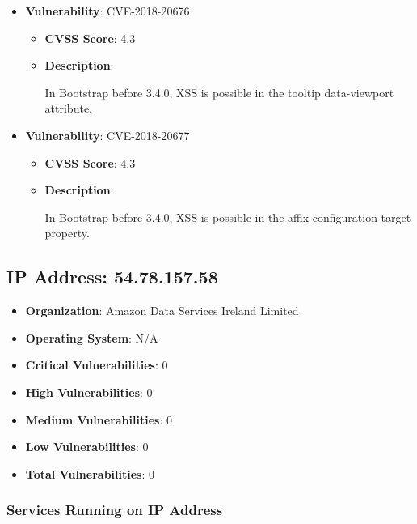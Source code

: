 \documentclass{article}
\begin{document}
\begin{itemize}
        \item \textbf{Vulnerability}: CVE-2018-20676
        \begin{itemize}
            \item \textbf{CVSS Score}:  4.3 
            \item \textbf{Description}:
            \parbox[t]{0.9\linewidth}{
                \ttfamily In Bootstrap before 3.4.0, XSS is possible in the tooltip data-viewport attribute.
            }
        \end{itemize}
    
        \item \textbf{Vulnerability}: CVE-2018-20677
        \begin{itemize}
            \item \textbf{CVSS Score}:  4.3 
            \item \textbf{Description}:
            \parbox[t]{0.9\linewidth}{
                \ttfamily In Bootstrap before 3.4.0, XSS is possible in the affix configuration target property.
            }
        \end{itemize}
    
\end{itemize}




\clearpage



\subsection*{IP Address: 54.78.157.58}

\begin{itemize}
    \item \textbf{Organization}: Amazon Data Services Ireland Limited
    \item \textbf{Operating System}:  N/A 
    \item \textbf{Critical Vulnerabilities}: 0
    \item \textbf{High Vulnerabilities}: 0
    \item \textbf{Medium Vulnerabilities}: 0
    \item \textbf{Low Vulnerabilities}: 0
    \item \textbf{Total Vulnerabilities}: 0
\end{itemize}

\subsubsection*{Services Running on IP Address}
\end{document}
